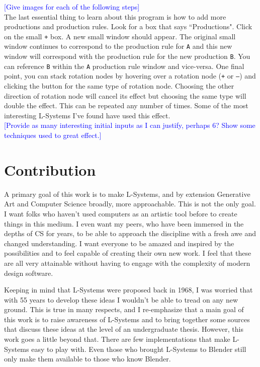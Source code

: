 \documentclass[12pt,twoside]{reedthesis}
\newcommand{\code}[1]{\texttt{#1}}
\begin{document}
	\textcolor{blue}{[Give images for each of the following steps]}\\
	
	The last essential thing to learn about this program is how to add more productions and production rules. Look for a box that says ``Productions". Click on the small \code{+} box. A new small window should appear. The original small window continues to correspond to the production rule for \code{A} and this new window will correspond with the production rule for the new production \code{B}. You can reference \code{B} within the \code{A} production rule window and vice-versa. One final point, you can stack rotation nodes by hovering over a rotation node (\code{+} or \code{–}) and clicking the button for the same type of rotation node. Choosing the other direction of rotation node will cancel its effect but choosing the same type will double the effect. This can be repeated any number of times. Some of the most interesting L-Systems I've found have used this effect.\\
	
	\textcolor{blue}{[Provide as many interesting initial inputs as I can justify, perhaps 6? Show some techniques used to great effect.]}

\chapter{Contribution}
	A primary goal of this work is to make L-Systems, and by extension Generative Art and Computer Science broadly, more approachable. This is not the only goal. I want folks who haven't used computers as an artistic tool before to create things in this medium. I even want my peers, who have been immersed in the depths of CS for years, to be able to approach the discipline with a fresh awe and changed understanding. I want everyone to be amazed and inspired by the possibilities and to feel capable of creating their own new work.  I feel that these are all very attainable without having to engage with the complexity of modern design software.
	
	Keeping in mind that L-Systems were proposed back in 1968, I was worried that with 55 years to develop these ideas I wouldn't be able to tread on any new ground. This is true in many respects, and I re-emphasize that a main goal of this work is to raise awareness of L-Systems and to bring together some sources that discuss these ideas at the level of an undergraduate thesis. However, this work goes a little beyond that. There are few implementations that make L-Systems easy to play with. Even those who brought L-Systems to Blender still only make them available to those who know Blender.
	
\end{document}
